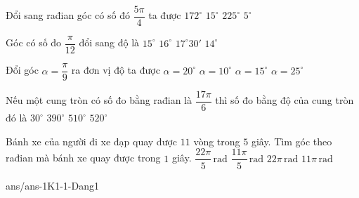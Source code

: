 \begin{ex}%
	Đổi sang rađian góc có số đó $\dfrac{5\pi}{4}$ ta được
	\choice
	{$172^\circ$}
	{$15^\circ$}
	{\True $225^\circ$}
	{$5^\circ$}
\end{ex}
\begin{ex}%
	Góc có số đo $\dfrac{\pi}{12}$ đổi sang độ là
	\choice
	{\True  $15^\circ$}
	{$16^\circ$}
	{$17^\circ 30'$}
	{$14^\circ$}
\end{ex}
\begin{ex}%
	Đổi góc $\alpha=\dfrac{\pi}{9}$ ra đơn vị độ ta được
	\choice
	{\True $\alpha=20^\circ$}
	{$\alpha=10^\circ$}
	{$\alpha=15^\circ$}
	{$\alpha=25^\circ$}
\end{ex}
\begin{ex}%
	Nếu một cung tròn có số đo bằng rađian là $\dfrac{17\pi }{6}$ thì số đo bằng độ của cung tròn đó là
	\choice
	{$30^{\circ}$}
	{$390^{\circ}$}
	{\True $510^{\circ}$}
	{$520^{\circ}$}
\end{ex}
\begin{ex}%
	Bánh xe của người đi xe đạp quay được $11$ vòng trong $5$ giây. Tìm góc theo rađian mà bánh xe quay được trong $1$ giây.
	\choice
	{\True$\dfrac{22\pi}{5}\,\mathrm{rad}$}
	{$\dfrac{11\pi}{5}\,\mathrm{rad}$}
	{$22\pi\,\mathrm{rad}$}
	{$11\pi\,\mathrm{rad}$}
\end{ex}
\begin{indapan}{10}
	{ans/ans-1K1-1-Dang1}
\end{indapan}